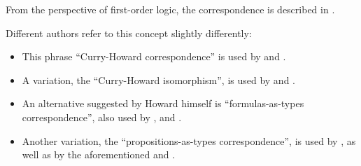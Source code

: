 \begin{comments}
  \item From the perspective of first-order logic, the correspondence is described in .

  \item Different authors refer to this concept slightly differently:
  \begin{itemize}
    \item This phrase \enquote{Curry-Howard correspondence} is used by  and .

    \item A variation, the \enquote{Curry-Howard isomorphism}, is used by  and .

    \item An alternative suggested by Howard himself is \enquote{formulas-as-types correspondence}, also used by ,  and .

    \item Another variation, the \enquote{propositions-as-types correspondence}, is used by , as well as by the aforementioned  and .
  \end{itemize}
\end{comments}


